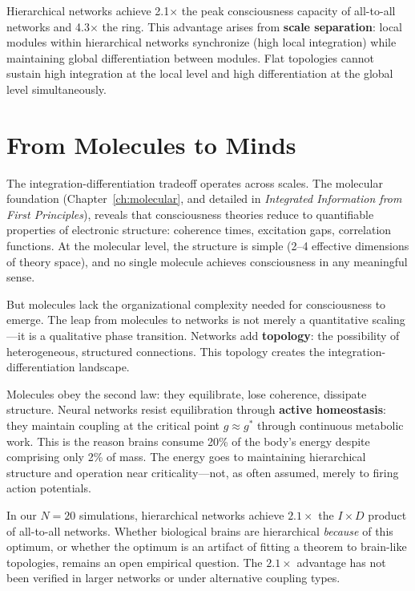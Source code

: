 Hierarchical networks achieve 2.1$\times$ the peak consciousness capacity of all-to-all networks and 4.3$\times$ the ring. This advantage arises from \textbf{scale separation}: local modules within hierarchical networks synchronize (high local integration) while maintaining global differentiation between modules. Flat topologies cannot sustain high integration at the local level and high differentiation at the global level simultaneously.

\section{From Molecules to Minds}

The integration-differentiation tradeoff operates across scales. The molecular foundation (Chapter~\ref{ch:molecular}, and detailed in \textit{Integrated Information from First Principles}), reveals that consciousness theories reduce to quantifiable properties of electronic structure: coherence times, excitation gaps, correlation functions. At the molecular level, the structure is simple (2--4 effective dimensions of theory space), and no single molecule achieves consciousness in any meaningful sense.

But molecules lack the organizational complexity needed for consciousness to emerge. The leap from molecules to networks is not merely a quantitative scaling---it is a qualitative phase transition. Networks add \textbf{topology}: the possibility of heterogeneous, structured connections. This topology creates the integration-differentiation landscape.

Molecules obey the second law: they equilibrate, lose coherence, dissipate structure. Neural networks resist equilibration through \textbf{active homeostasis}: they maintain coupling at the critical point $g \approx g^*$ through continuous metabolic work. This is the reason brains consume 20\% of the body's energy despite comprising only 2\% of mass. The energy goes to maintaining hierarchical structure and operation near criticality---not, as often assumed, merely to firing action potentials.

In our $N=20$ simulations, hierarchical networks achieve $2.1\times$ the $I \times D$ product of all-to-all networks. Whether biological brains are hierarchical \emph{because} of this optimum, or whether the optimum is an artifact of fitting a theorem to brain-like topologies, remains an open empirical question. The $2.1\times$ advantage has not been verified in larger networks or under alternative coupling types.

